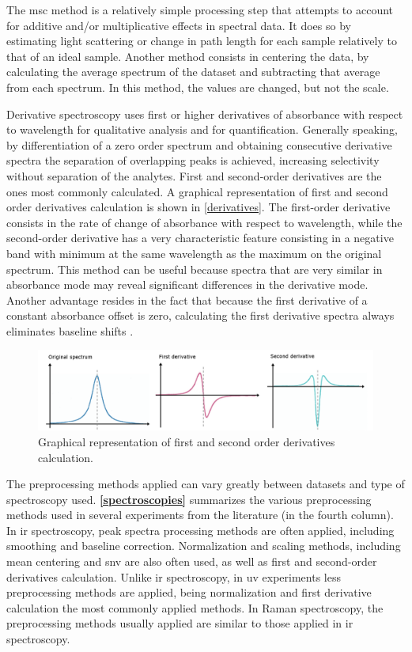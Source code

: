 The \acrfull{msc} method is a relatively simple processing step that attempts to account for additive and/or multiplicative effects in spectral data. It does so by estimating light scattering or change in path length for each sample relatively to that of an ideal sample. Another method consists in centering the data, by calculating the average spectrum of the dataset and subtracting that average from each spectrum. In this method, the values are changed, but not the scale.

Derivative spectroscopy uses first or higher derivatives of absorbance with respect to wavelength for qualitative analysis and for quantification. Generally speaking, by differentiation of a zero order spectrum and obtaining consecutive derivative spectra the separation of overlapping peaks is achieved, increasing selectivity without separation of the analytes. First and second-order derivatives are the ones most commonly calculated. A graphical representation of first and second order derivatives calculation is shown in \autoref{derivatives}. The first-order derivative consists in the rate of change of absorbance with respect to wavelength, while the second-order derivative has a very characteristic feature consisting in a negative band with minimum at the same wavelength as the maximum on the original spectrum. This method can be useful because spectra that are very similar in absorbance mode may reveal significant differences in the derivative mode. Another advantage resides in the fact that because the first derivative of a constant absorbance offset is zero, calculating the first derivative spectra always eliminates baseline shifts \citep{kus1996derivative}.

\begin{figure}[!htb]
	\centering
	\includegraphics[width=1\linewidth]{Imagens/derivatives}
	\caption{Graphical representation of first and second order derivatives calculation.}
	\label{derivatives}
\end{figure}


The preprocessing methods applied can vary greatly between datasets and type of spectroscopy used. \textbf{\autoref{spectroscopies}} summarizes the various preprocessing methods used in several experiments from the literature (in the fourth column). In \gls{ir} spectroscopy, peak spectra processing methods are often applied, including smoothing and baseline correction. Normalization and scaling methods, including mean centering and \gls{snv} are also often used, as well as first and second-order derivatives calculation. Unlike \gls{ir} spectroscopy, in \gls{uv} experiments less preprocessing methods are applied, being normalization and first derivative calculation the most commonly applied methods. In Raman spectroscopy, the preprocessing methods usually applied are similar to those applied in \gls{ir} spectroscopy.





